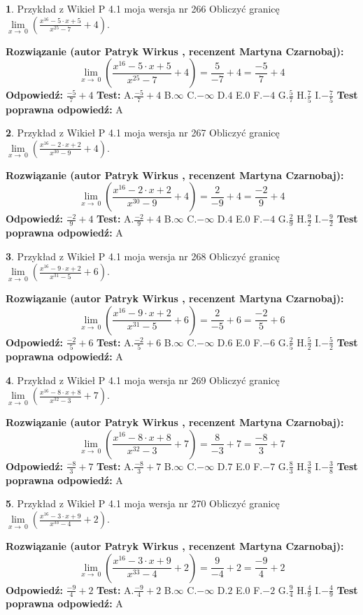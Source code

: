 \documentclass[12pt, a4paper]{article}
\theoremstyle{definition} %
\newtheorem{zad}{}
\newcommand{\zadStart}[1]{\begin{zad}#1\newline}
\newcommand{\zadStop}{\end{zad}}
\newcommand{\rozwStart}[2]{\noindent \textbf{Rozwiązanie (autor #1 , recenzent #2): }\newline}
\newcommand{\rozwStop}{\newline}
\newcommand{\odpStart}{\noindent \textbf{Odpowiedź:}\newline}
\newcommand{\odpStop}{\newline}
\newcommand{\testStart}{\noindent \textbf{Test:}\newline}
\newcommand{\testStop}{\newline}
\newcommand{\kluczStart}{\noindent \textbf{Test poprawna odpowiedź:}\newline}
\newcommand{\kluczStop}{\newline}
\begin{document}
\zadStart{Przykład z Wikieł P 4.1 moja wersja nr 266}
Obliczyć granicę $\lim\limits_{x\to\ 0}(\frac{x^{16}-5 \cdot x +5}{x^{25}-7}+4)$.
\zadStop
\rozwStart{Patryk Wirkus}{Martyna Czarnobaj}
$$\lim\limits_{x\to\ 0}(\frac{x^{16}-5 \cdot x +5}{x^{25}-7}+4)=\frac{5}{-7}+4=\frac{-5}{7}+4$$
\rozwStop
\odpStart
$\frac{-5}{7}+4$
\odpStop
\testStart
A.$\frac{-5}{7}+4$
B.$\infty$
C.$-\infty$
D.$4$
E.$0$
F.$-4$
G.$\frac{5}{7}$
H.$\frac{7}{5}$
I.$-\frac{7}{5}$
\testStop
\kluczStart
A
\kluczStop



\zadStart{Przykład z Wikieł P 4.1 moja wersja nr 267}
Obliczyć granicę $\lim\limits_{x\to\ 0}(\frac{x^{16}-2 \cdot x +2}{x^{30}-9}+4)$.
\zadStop
\rozwStart{Patryk Wirkus}{Martyna Czarnobaj}
$$\lim\limits_{x\to\ 0}(\frac{x^{16}-2 \cdot x +2}{x^{30}-9}+4)=\frac{2}{-9}+4=\frac{-2}{9}+4$$
\rozwStop
\odpStart
$\frac{-2}{9}+4$
\odpStop
\testStart
A.$\frac{-2}{9}+4$
B.$\infty$
C.$-\infty$
D.$4$
E.$0$
F.$-4$
G.$\frac{2}{9}$
H.$\frac{9}{2}$
I.$-\frac{9}{2}$
\testStop
\kluczStart
A
\kluczStop



\zadStart{Przykład z Wikieł P 4.1 moja wersja nr 268}
Obliczyć granicę $\lim\limits_{x\to\ 0}(\frac{x^{16}-9 \cdot x +2}{x^{31}-5}+6)$.
\zadStop
\rozwStart{Patryk Wirkus}{Martyna Czarnobaj}
$$\lim\limits_{x\to\ 0}(\frac{x^{16}-9 \cdot x +2}{x^{31}-5}+6)=\frac{2}{-5}+6=\frac{-2}{5}+6$$
\rozwStop
\odpStart
$\frac{-2}{5}+6$
\odpStop
\testStart
A.$\frac{-2}{5}+6$
B.$\infty$
C.$-\infty$
D.$6$
E.$0$
F.$-6$
G.$\frac{2}{5}$
H.$\frac{5}{2}$
I.$-\frac{5}{2}$
\testStop
\kluczStart
A
\kluczStop



\zadStart{Przykład z Wikieł P 4.1 moja wersja nr 269}
Obliczyć granicę $\lim\limits_{x\to\ 0}(\frac{x^{16}-8 \cdot x +8}{x^{32}-3}+7)$.
\zadStop
\rozwStart{Patryk Wirkus}{Martyna Czarnobaj}
$$\lim\limits_{x\to\ 0}(\frac{x^{16}-8 \cdot x +8}{x^{32}-3}+7)=\frac{8}{-3}+7=\frac{-8}{3}+7$$
\rozwStop
\odpStart
$\frac{-8}{3}+7$
\odpStop
\testStart
A.$\frac{-8}{3}+7$
B.$\infty$
C.$-\infty$
D.$7$
E.$0$
F.$-7$
G.$\frac{8}{3}$
H.$\frac{3}{8}$
I.$-\frac{3}{8}$
\testStop
\kluczStart
A
\kluczStop



\zadStart{Przykład z Wikieł P 4.1 moja wersja nr 270}
Obliczyć granicę $\lim\limits_{x\to\ 0}(\frac{x^{16}-3 \cdot x +9}{x^{33}-4}+2)$.
\zadStop
\rozwStart{Patryk Wirkus}{Martyna Czarnobaj}
$$\lim\limits_{x\to\ 0}(\frac{x^{16}-3 \cdot x +9}{x^{33}-4}+2)=\frac{9}{-4}+2=\frac{-9}{4}+2$$
\rozwStop
\odpStart
$\frac{-9}{4}+2$
\odpStop
\testStart
A.$\frac{-9}{4}+2$
B.$\infty$
C.$-\infty$
D.$2$
E.$0$
F.$-2$
G.$\frac{9}{4}$
H.$\frac{4}{9}$
I.$-\frac{4}{9}$
\testStop
\kluczStart
A
\kluczStop
\end{document}
